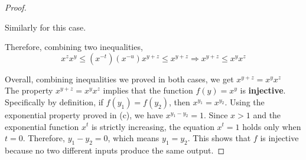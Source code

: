 \documentclass{article}
\begin{document}
\begin{proof}
\begin{enumerate}
\begin{enumerate}
            Similarly for this case.
        \end{enumerate}
        Therefore, combining two inequalities,
        \[ x^z x^y \leq (x^{-t})(x^{-u})x^{y + z} \leq x^{y + z} \Rightarrow x^{y + z} \leq x^y x^z \]
    \end{enumerate}
    Overall, combining inequalities we proved in both cases, we get $x^{y + z} = x^y x^z$
    \\
    The property \( x^{y+z} = x^y x^z \) implies that the function \( f(y) = x^y \) is \textbf{injective}.
    Specifically by definition, if \( f(y_1) = f(y_2) \), then \( x^{y_1} = x^{y_2} \). Using the exponential property proved in (c), we have \( x^{y_1 - y_2} = 1 \). Since \( x > 1 \) and the exponential function \( x^t \) is strictly increasing, the equation \( x^t = 1 \) holds only when \( t = 0 \). Therefore, \( y_1 - y_2 = 0 \), which means \( y_1 = y_2 \). 
    This shows that \( f \) is injective because no two different inputs produce the same output.
\end{proof}
\end{document}
